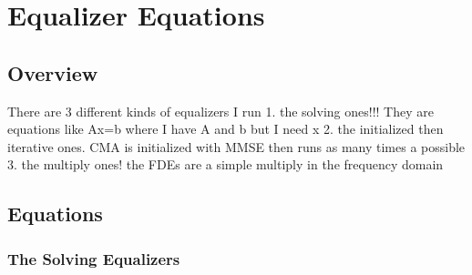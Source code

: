 

\chapter{Equalizer Equations}
\label{sec:eq_eq}

\section{Overview}
There are 3 different kinds of equalizers I run
1. the solving ones!!!  They are equations like Ax=b where I have A and b but I need x
2. the initialized then iterative ones. CMA is initialized with MMSE then runs as many times a possible
3. the multiply ones! the FDEs are a simple multiply in the frequency domain

\section{Equations}

\subsection{The Solving Equalizers}


